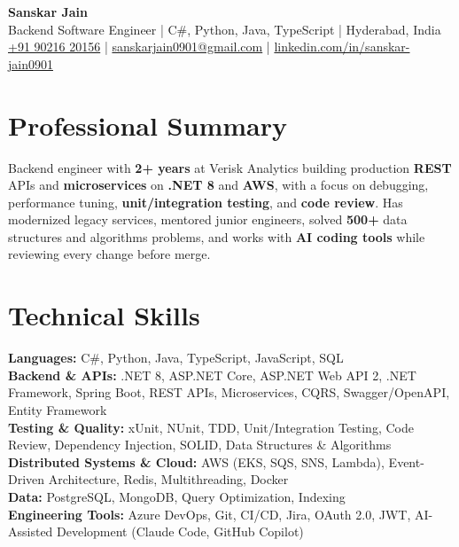 \documentclass[a4paper,10pt]{article}
\begin{document}
\begin{center}
    {\LARGE \textbf{Sanskar Jain}} \\
    \vspace{2pt}
    Backend Software Engineer \;|\; C\#, Python, Java, TypeScript \;|\; Hyderabad, India \\
    \href{tel:+919021620156}{+91 90216 20156} \;|\;
    \href{mailto:sanskarjain0901@gmail.com}{sanskarjain0901@gmail.com} \;|\;
    \href{https://www.linkedin.com/in/sanskar-jain0901/}{linkedin.com/in/sanskar-jain0901}
\end{center}

\section*{Professional Summary}
Backend engineer with \textbf{2+ years} at Verisk Analytics building production \textbf{REST} APIs and \textbf{microservices} on \textbf{.NET 8} and \textbf{AWS}, with a focus on debugging, performance tuning, \textbf{unit/integration testing}, and \textbf{code review}. Has modernized legacy services, mentored junior engineers, solved \textbf{500+} data structures and algorithms problems, and works with \textbf{AI coding tools} while reviewing every change before merge.

\section*{Technical Skills}
\begin{sloppypar}
\noindent
\textbf{Languages:} C\#, Python, Java, TypeScript, JavaScript, SQL \\
\textbf{Backend \& APIs:} .NET 8, ASP.NET Core, ASP.NET Web API 2, .NET Framework, Spring Boot, REST APIs, Microservices, CQRS, Swagger/OpenAPI, Entity Framework \\
\textbf{Testing \& Quality:} xUnit, NUnit, TDD, Unit/Integration Testing, Code Review, Dependency Injection, SOLID, Data Structures \& Algorithms \\
\textbf{Distributed Systems \& Cloud:} AWS (EKS, SQS, SNS, Lambda), Event-Driven Architecture, Redis, Multithreading, Docker \\
\textbf{Data:} PostgreSQL, MongoDB, Query Optimization, Indexing \\
\textbf{Engineering Tools:} Azure DevOps, Git, CI/CD, Jira, OAuth 2.0, JWT, AI-Assisted Development (Claude Code, GitHub Copilot)
\end{sloppypar}
\end{document}
